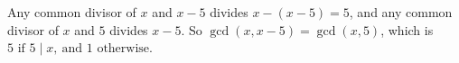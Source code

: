 Any common divisor of $x$ and $x-5$ divides $x-(x-5)=5$, and any common divisor of $x$ and $5$ divides $x-5$. So $\gcd(x,x-5)=\gcd(x,5)$, which is $\boxed{5\text{ if }5\mid x,\ \text{and }1\text{ otherwise}}$.
